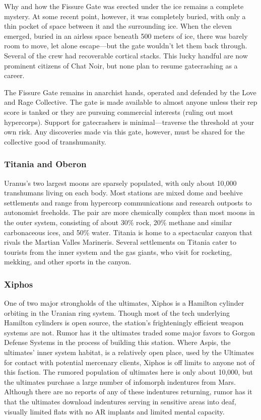 Why and how the Fissure Gate was erected under the ice remains a complete mystery. At some recent point, however, it was completely buried, with only a thin pocket of space between it and the surrounding ice. When the eleven emerged, buried in an airless space beneath 500 meters of ice, there was barely room to move, let alone escape—but the gate wouldn't let them back through. Several of the crew had recoverable cortical stacks. This lucky handful are now prominent citizens of Chat Noir, but none plan to resume gatecrashing as a career. 

The Fissure Gate remains in anarchist hands, operated and defended by the Love and Rage Collective. The gate is made available to almost anyone unless their rep score is tanked or they are pursuing commercial interests (ruling out most hypercorps). Support for gatecrashers is minimal—traverse the threshold at your own risk. Any discoveries made via this gate, however, must be shared for the collective good of transhumanity. 

\subsubsection{Titania and Oberon} \label{sec:titania-oberon} 

Uranus's two largest moons are sparsely populated, with only about 10,000 transhumans living on each body. Most stations are mixed dome and beehive settlements and range from hypercorp communications and research outposts to autonomist freeholds. The pair are more chemically complex than most moons in the outer system, consisting of about 30\% rock, 20\% methane and similar carbonaceous ices, and 50\% water. Titania is home to a spectacular canyon that rivals the Martian Valles Marineris. Several settlements on Titania cater to tourists from the inner system and the gas giants, who visit for rocketing, mekking, and other sports in the canyon. 

\subsubsection{Xiphos} \label{sec:xiphos} 

One of two major strongholds of the ultimates, Xiphos is a Hamilton cylinder orbiting in the Uranian ring system. Though most of the tech underlying Hamilton cylinders is open source, the station's frighteningly efficient weapon systems are not. Rumor has it the ultimates traded some major favors to Gorgon Defense Systems in the process of building this station. Where Aspis, the ultimates' inner system habitat, is a relatively open place, used by the Ultimates for contact with potential mercenary clients, Xiphos is off limits to anyone not of this faction. The rumored population of ultimates here is only about 10,000, but the ultimates purchase a large number of infomorph indentures from Mars. Although there are no reports of any of these indentures returning, rumor has it that the ultimates download indentures serving in sensitive areas into deaf, visually limited flats with no AR implants and limited mental capacity. 

